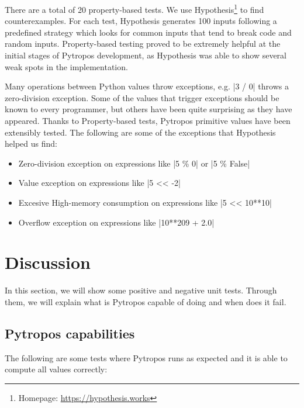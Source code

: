 There are a total of 20 property-based tests. We use Hypothesis\footnote{Homepage:
\url{https://hypothesis.works}} to find counterexamples. For each test, Hypothesis
generates 100 inputs following a predefined strategy which looks for common inputs that
tend to break code and random inputs. Property-based testing proved to be extremely
helpful at the initial stages of Pytropos development, as Hypothesis was able to show
several weak spots in the implementation.

Many operations between Python values throw exceptions, e.g. \pycode|3 / 0| throws a
zero-division exception. Some of the values that trigger exceptions should be known to
every programmer, but others have been quite surprising as they have appeared. Thanks to
Property-based tests, Pytropos primitive values have been extensibly tested. The following
are some of the exceptions that Hypothesis helped us find:

\begin{itemize}
\tightlist
\item Zero-division exception on expressions like \pycode|5 \% 0| or \pycode|5 \% False|
\item Value exception on expressions like \pycode|5 << -2|
\item Excesive High-memory consumption on expressions like \pycode|5 << 10**10|
\item Overflow exception on expressions like \pycode|10**209 + 2.0|
\end{itemize}

\section{Discussion}\label{discussion}

In this section, we will show some positive and negative unit tests. Through them, we will
explain what is Pytropos capable of doing and when does it fail.

\subsection*{Pytropos capabilities}

The following are some tests where Pytropos runs as expected and it is able to compute all values correctly:

